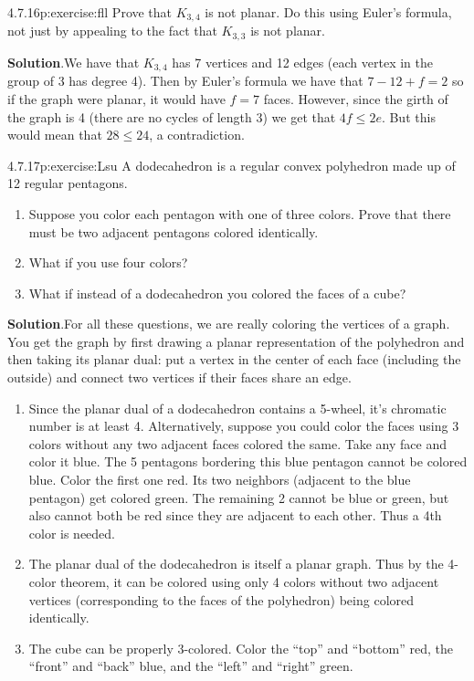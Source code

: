 \documentclass[twoside,11pt,]{book}
\newcommand{\blocktitlefont}{\relax}
\numberwithin{equation}{chapter}
\begin{document}
\begin{divisionsolution}{4.7.16}{}{p:exercise:fll}%
Prove that \(K_{3,4}\) is not planar. Do this using Euler's formula, not just by appealing to the fact that \(K_{3,3}\) is not planar.%
\par\smallskip%
\noindent\textbf{\blocktitlefont Solution}.\quad{}We have that \(K_{3,4}\) has 7 vertices and 12 edges (each vertex in the group of 3 has degree 4). Then by Euler's formula we have that \(7 - 12 + f = 2\) so if the graph were planar, it would have \(f = 7\) faces. However, since the girth of the graph is 4 (there are no cycles of length 3) we get that \(4f \le 2e\). But this would mean that \(28 \le 24\), a contradiction.%
\end{divisionsolution}%
\begin{divisionsolution}{4.7.17}{}{p:exercise:Lsu}%
A dodecahedron is a regular convex polyhedron made up of 12 regular pentagons.%
\begin{enumerate}[label=(\alph*)]
\item{}Suppose you color each pentagon with one of three colors. Prove that there must be two adjacent pentagons colored identically.%
\item{}What if you use four colors?%
\item{}What if instead of a dodecahedron you colored the faces of a cube?%
\end{enumerate}
%
\par\smallskip%
\noindent\textbf{\blocktitlefont Solution}.\quad{}For all these questions, we are really coloring the vertices of a graph. You get the graph by first drawing a planar representation of the polyhedron and then taking its planar dual: put a vertex in the center of each face (including the outside) and connect two vertices if their faces share an edge.%
\begin{enumerate}[label=(\alph*)]
\item{}Since the planar dual of a dodecahedron contains a 5-wheel, it's chromatic number is at least 4. Alternatively, suppose you could color the faces using 3 colors without any two adjacent faces colored the same. Take any face and color it blue. The 5 pentagons bordering this blue pentagon cannot be colored blue. Color the first one red. Its two neighbors (adjacent to the blue pentagon) get colored green. The remaining 2 cannot be blue or green, but also cannot both be red since they are adjacent to each other. Thus a 4th color is needed.%
\item{}The planar dual of the dodecahedron is itself a planar graph. Thus by the 4-color theorem, it can be colored using only 4 colors without two adjacent vertices (corresponding to the faces of the polyhedron) being colored identically.%
\item{}The cube can be properly 3-colored. Color the ``top'' and ``bottom'' red, the ``front'' and ``back'' blue, and the ``left'' and ``right'' green.%
\end{enumerate}
%
\end{divisionsolution}%
\end{document}
